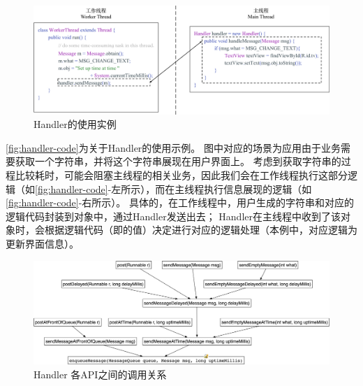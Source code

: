 \begin{figure}[h]
	\centering
	\includegraphics[width=\textwidth]{./Figures/handler-code.png}
	\caption{Handler的使用实例}
	\label{fig:handler-code}
\end{figure}


\autoref{fig:handler-code}为关于Handler的使用示例。
图中对应的场景为应用由于业务需要获取一个字符串，并将这个字符串展现在用户界面上。
考虑到获取字符串的过程比较耗时，可能会阻塞主线程的相关业务，因此我们会在工作线程执行这部分逻辑（如\autoref{fig:handler-code}-左所示），而在主线程执行信息展现的逻辑（如\autoref{fig:handler-code}-右所示）。
具体的，在工作线程中，用户生成的字符串和对应的逻辑代码封装到对象中，通过Handler发送出去；
Handler在主线程中收到了该对象时，会根据逻辑代码（即的值）决定进行对应的逻辑处理（本例中，对应逻辑为更新界面信息）。





\begin{figure}[hb]
	\centering
	\includegraphics[width=\textwidth]{./Figures/Handler-apis.png}
	\caption{ Handler 各API之间的调用关系}
	\label{fig:handler-apis}
\end{figure}


